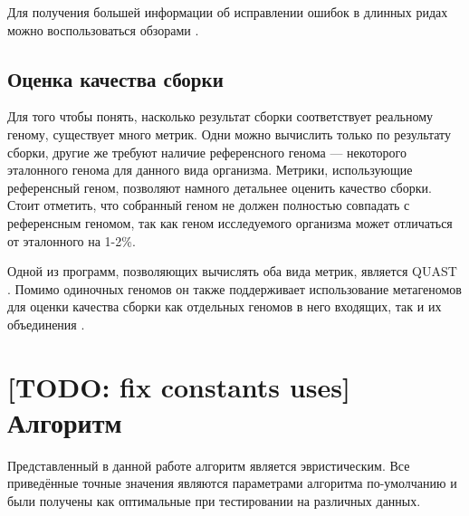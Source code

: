 \documentclass[14pt]{matmex-diploma-custom}
\begin{document}
Для получения большей информации об исправлении ошибок в длинных ридах можно воспользоваться обзорами \cite{art:morisse2020long, art:zook2016extensive, art:zhang2020comprehensive}.

\subsection{Оценка качества сборки}
Для того чтобы понять, насколько результат сборки соответствует реальному геному, существует много метрик. Одни можно вычислить только по результату сборки, другие же требуют наличие референсного генома --- некоторого эталонного генома для данного вида организма. Метрики, использующие референсный геном, позволяют намного детальнее оценить качество сборки. Стоит отметить, что собранный геном не должен полностью совпадать с референсным геномом, так как геном исследуемого организма может отличаться от эталонного на 1-2\%.

Одной из программ, позволяющих вычислять оба вида метрик, является QUAST \cite{art:QUAST}. Помимо одиночных геномов он также поддерживает использование  метагеномов для оценки качества сборки как отдельных геномов в него входящих, так и их объединения \cite{art:metaquast}.

\section{[TODO: fix constants uses] Алгоритм}

Представленный в данной работе алгоритм является эвристическим. Все приведённые точные значения являются параметрами алгоритма по-умолчанию и были получены как оптимальные при тестировании на различных данных.
\end{document}
